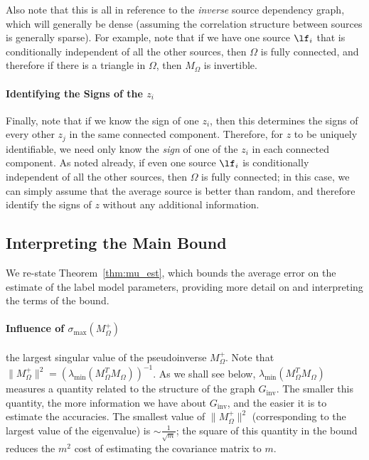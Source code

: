 \documentclass[letterpaper]{article}
\begin{document}
\begin{appendix}
Also note that this is all in reference to the \textit{inverse} source dependency graph, which will generally be dense (assuming the correlation structure between sources is generally sparse).
For example, note that if we have one source $\lf_i$ that is conditionally independent of all the other sources, then $\Omega$ is fully connected, and therefore if there is a triangle in $\Omega$, then $M_\Omega$ is invertible.

\paragraph*{Identifying the Signs of the $z_i$}
Finally, note that if we know the sign of one $z_i$, then this determines the signs of every other $z_j$ in the same connected component.
Therefore, for $z$ to be uniquely identifiable, we need only know the \textit{sign} of one of the $z_i$ in each connected component.
As noted already, if even one source $\lf_i$ is conditionally independent of all the other sources, then $\Omega$ is fully connected; in this case, we can simply assume that the average source is better than random, and therefore identify the signs of $z$ without any additional information.

\subsection{Interpreting the Main Bound} 
\label{appendix:interpreting-bound}
We re-state Theorem~\ref{thm:mu_est}, which bounds the average error on the estimate of the label model parameters, providing more detail on and interpreting the terms of the bound.

\thmmuest*

\paragraph*{Influence of $\sigma_{\max}(M_{\Omega}^+)$} the largest singular value of the pseudoinverse $M_{\Omega}^+$. Note that $\|M_{\Omega}^+\|^2 = (\lambda_{\min}(M_{\Omega}^TM_{\Omega}))^{-1}$. As we shall see below, $\lambda_{\min}(M_{\Omega}^TM_{\Omega})$ measures a quantity related to the structure of the graph $G_{\text{inv}}$. The smaller this quantity, the more information we have about $G_{\text{inv}}$, and the easier it is to estimate the accuracies. The smallest value of $\|M_{\Omega}^+\|^2$ (corresponding to the largest value of the eigenvalue) is $\sim \frac{1}{\sqrt{m}}$; the square of this quantity in the bound reduces the $m^2$ cost of estimating the covariance matrix to $m$.


\end{appendix}
\end{document}
